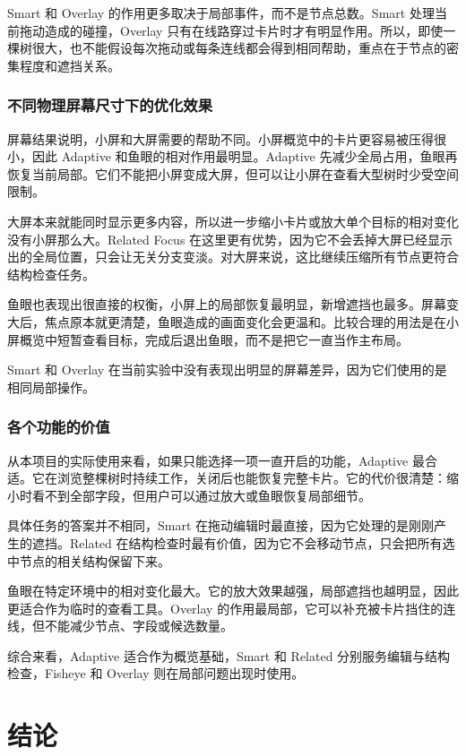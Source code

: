 \documentclass[11pt,a4paper,oneside,extrafontsizes]{memoir}
\begin{document}
Smart 和 Overlay 的作用更多取决于局部事件，而不是节点总数。Smart 处理当前拖动造成的碰撞，Overlay 只有在线路穿过卡片时才有明显作用。所以，即使一棵树很大，也不能假设每次拖动或每条连线都会得到相同帮助，重点在于节点的密集程度和遮挡关系。

\subsection{不同物理屏幕尺寸下的优化效果}

屏幕结果说明，小屏和大屏需要的帮助不同。小屏概览中的卡片更容易被压得很小，因此 Adaptive 和鱼眼的相对作用最明显。Adaptive 先减少全局占用，鱼眼再恢复当前局部。它们不能把小屏变成大屏，但可以让小屏在查看大型树时少受空间限制。

大屏本来就能同时显示更多内容，所以进一步缩小卡片或放大单个目标的相对变化没有小屏那么大。Related Focus 在这里更有优势，因为它不会丢掉大屏已经显示出的全局位置，只会让无关分支变淡。对大屏来说，这比继续压缩所有节点更符合结构检查任务。

鱼眼也表现出很直接的权衡，小屏上的局部恢复最明显，新增遮挡也最多。屏幕变大后，焦点原本就更清楚，鱼眼造成的画面变化会更温和。比较合理的用法是在小屏概览中短暂查看目标，完成后退出鱼眼，而不是把它一直当作主布局。

Smart 和 Overlay 在当前实验中没有表现出明显的屏幕差异，因为它们使用的是相同局部操作。

\subsection{各个功能的价值}

从本项目的实际使用来看，如果只能选择一项一直开启的功能，Adaptive 最合适。它在浏览整棵树时持续工作，关闭后也能恢复完整卡片。它的代价很清楚：缩小时看不到全部字段，但用户可以通过放大或鱼眼恢复局部细节。

具体任务的答案并不相同，Smart 在拖动编辑时最直接，因为它处理的是刚刚产生的遮挡。Related 在结构检查时最有价值，因为它不会移动节点，只会把所有选中节点的相关结构保留下来。

鱼眼在特定环境中的相对变化最大。它的放大效果越强，局部遮挡也越明显，因此更适合作为临时的查看工具。Overlay 的作用最局部，它可以补充被卡片挡住的连线，但不能减少节点、字段或候选数量。

综合来看，Adaptive 适合作为概览基础，Smart 和 Related 分别服务编辑与结构检查，Fisheye 和 Overlay 则在局部问题出现时使用。

\chapter{结论}
\end{document}
